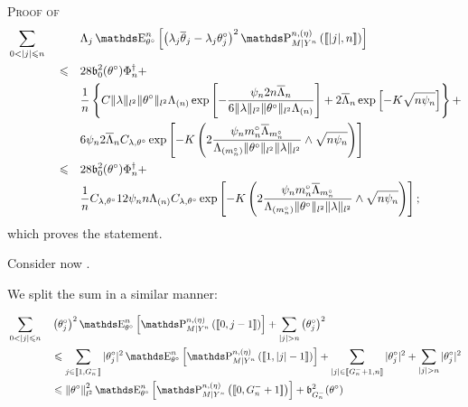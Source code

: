 \begin{pro}{\textsc{Proof of } \\}
\begin{alignat*}{3}
& \sum\limits_{0 < \vert j \vert \leq n} && && \Lambda_{j} \E_{\theta^{\circ}}^{n}\left[\left(\lambda_{j} \overline{\theta}_{j} - \lambda_{j} \theta^{\circ}_{j}\right)^{2} \P_{M \vert Y^{n}}^{n, (\eta)}\left(\llbracket \vert j \vert, n \rrbracket\right)\right]\notag \\
& && \leq && 28 \mathfrak{b}_{0}^{2}(\theta^{\circ}) \Phi^{\dagger}_{n} +\notag\\
& && && \frac{1}{n} \left\{ C \Vert \lambda \Vert_{l^{2}} \Vert \theta^{\circ} \Vert_{l^{2}} \Lambda_{(n)} \exp\left[ -\frac{\psi_{n} 2 n \overline{\Lambda}_{n}}{6 \Vert \lambda \Vert_{l^{2}} \Vert \theta^{\circ} \Vert_{l^{2}} \Lambda_{(n)}} \right] + 2 \overline{\Lambda}_{n} \exp\left[- K \sqrt{n \psi_{n}}\right]\right\} +\notag \\
& && && 6 \psi_{n} 2 \overline{\Lambda}_{n} C_{\lambda, \theta^{\circ}} \exp\left[- K \left(2 \frac{\psi_{n} m^{\circ}_{n} \overline{\Lambda}_{m^{\circ}_{n}}}{\Lambda_{(m^{\circ}_{n})}\Vert \theta^{\circ} \Vert_{l^{2}} \Vert \lambda \Vert_{l^{2}}} \wedge \sqrt{n \psi_{n}}\right)\right]\\
& && \leq && 28 \mathfrak{b}_{0}^{2}(\theta^{\circ}) \Phi^{\dagger}_{n} +\notag\\
& && && \frac{1}{n} C_{\lambda, \theta^{\circ}} 12 \psi_{n} n \Lambda_{(n)} C_{\lambda, \theta^{\circ}} \exp\left[- K \left(2 \frac{\psi_{n} m^{\circ}_{n} \overline{\Lambda}_{m^{\circ}_{n}}}{\Lambda_{(m^{\circ}_{n})}\Vert \theta^{\circ} \Vert_{l^{2}} \Vert \lambda \Vert_{l^{2}}} \wedge \sqrt{n \psi_{n}}\right)\right];
\end{alignat*}
which proves the statement.

\bigskip

Consider now .

We split the sum in a similar manner:
 
\begin{alignat*}{2}
& \sum\limits_{0 < \vert j \vert \leq n} && \left(\theta^{\circ}_{j}\right)^{2} \E_{\theta^{\circ}}^{n}\left[\P_{M \vert Y^{n}}^{n, (\eta)}\left(\llbracket 0, j-1 \rrbracket \right)\right] + \sum\limits_{ \vert j \vert > n} \left( \theta^{\circ}_{j}\right)^{2}\\
& && \leq \sum\limits_{j \in \llbracket 1, G^{-}_{n} \rrbracket} \vert \theta^{\circ}_{j}\vert^{2} \E_{\theta^{\circ}}^{n}\left[\P_{M \vert Y^{n}}^{n, (\eta)}\left(\llbracket 1, \vert j \vert-1 \rrbracket\right)\right] + \sum\limits_{\vert j \vert \in \llbracket G^{-}_{n} + 1, n\rrbracket} \vert \theta^{\circ}_{j} \vert^{2} + \sum\limits_{\vert j \vert > n} \vert \theta^{\circ}_{j} \vert^{2}\\
& && \leq \left\Vert \theta^{\circ} \right\Vert_{l^{2}}^{2} \E_{\theta^{\circ}}^{n}\left[\P_{M \vert Y^{n}}^{n, (\eta)}\left(\llbracket 0, G^{-}_{n} + 1\rrbracket\right)\right] + \mathfrak{b}_{G^{-}_{n}}^{2}(\theta^{\circ})
\end{alignat*}


\end{pro}
